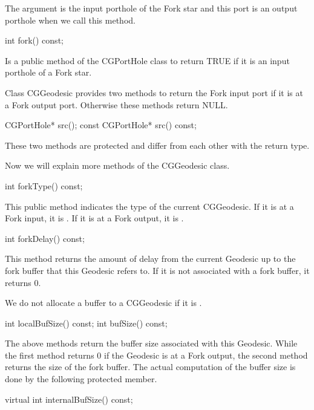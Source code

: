 The argument is the input porthole of the Fork star and this port is
an output porthole when we call this method. 

\begin{example}
int fork() const;
\end{example}

Is a public method of the CGPortHole class to return TRUE if it is an
input porthole of a Fork star.

Class CGGeodesic provides two methods to return the Fork input port
if it is at a Fork output port. Otherwise these methods return NULL.

\begin{example}
CGPortHole* src();
const CGPortHole* src() const;
\end{example}

These two methods are protected and differ from each other with the return
type. 

Now we will explain more methods of the CGGeodesic class.

\begin{example}
int forkType() const;
\end{example}

This public method indicates the type of the current CGGeodesic. If it
is at a Fork input, it is . If it is at a Fork output, it is
.

\begin{example}
int forkDelay() const;
\end{example}

This method returns the amount of delay from the current Geodesic up to
the fork buffer that this Geodesic refers to. If it is not associated
with a fork buffer, it returns 0.

We do not allocate a buffer to a CGGeodesic if it is .

\begin{example}
int localBufSize() const;
int bufSize() const;
\end{example}

The above methods return the buffer size associated with this Geodesic.
While the first method returns 0 if the Geodesic is at a Fork output, the
second method returns the size of the fork buffer. The actual computation of
the buffer size is done by the following protected member.

\begin{example}
virtual int internalBufSize() const;
\end{example}

